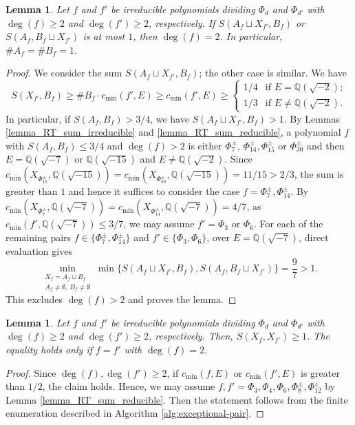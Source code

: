 \documentclass[11pt]{amsart}
\theoremstyle{plain}
\newtheorem{lem}[thm]{Lemma}
\theoremstyle{definition}
\numberwithin{equation}{section}
\def\Q{{\mathbb Q}}
\newcommand{\bbQ}{\mathbb{Q}}
\begin{document}
\begin{lem}\label{lemma_S_XA_B}
  Let $f$ and $f'$ be irreducible polynomials dividing $\Phi_d$ and $\Phi_{d'}$ with $\deg(f) \geq 2$ and $\deg(f') \geq 2$, respectively.
  If $S(A_f \sqcup X_{f'}, B_f)$
    or $S(A_f,B_f \sqcup X_{f'})$ is at most $1$, then $\deg(f) = 2$.
  In particular, $\#A_f = \#B_f = 1$.
\end{lem}
\begin{proof}
  We consider the sum $S(A_f \sqcup X_{f'}, B_f)$; the other case is similar.
  We have
  \[
    S(X_{f'},B_f) \geq \#B_f \cdot c_{\min}(f',E) \geq c_{\min}(f',E) \geq
    \begin{cases}
      1/4 & \text{if $E = \bbQ(\sqrt{-2})$;}\\
      1/3 & \text{if $E \neq \bbQ(\sqrt{-2})$.}
    \end{cases}
  \]
  In particular, if $S(A_f, B_f) >3/4$, we have
  $S(A_f \sqcup X_{f'}, B_f)> 1$.
  By Lemmas \ref{lemma_RT_sum_irreducible} and \ref{lemma_RT_sum_reducible}, a polynomial $f$ with $S(A_f, B_f) \leq 3/4$ and $\deg(f) > 2$ is either $\Phi_7^{\pm}$, $\Phi_{14}^\pm, \Phi_{15}^\pm$ or $\Phi_{30}^\pm$ and then $E = \bbQ(\sqrt{-7})$ or $\bbQ(\sqrt{-15})$ and $E \neq \bbQ(\sqrt{-2})$.
  Since $c_{\min}(X_{\Phi_{15}^\pm}, \bbQ(\sqrt{-15})) = c_{\min}(X_{\Phi_{30}^\pm}, \bbQ(\sqrt{-15})) = 11/15 > 2/3$, the sum is greater than $1$ and hence it suffices to consider the case $f = \Phi_7^\pm, \Phi_{14}^\pm$.
  By $c_{\min}(X_{\Phi_{7}^\pm}, \bbQ(\sqrt{-7})) = c_{\min}(X_{\Phi_{14}^\pm}, \bbQ(\sqrt{-7})) = 4/7$, as $c_{\min}(f',\bbQ(\sqrt{-7})) \leq 3/7$, we may assume $f' = \Phi_3$ or $\Phi_6$.
 For each of the remaining pairs $f\in\{\Phi_7^\pm,\Phi_{14}^\pm\}$ and $f'\in\{\Phi_3,\Phi_6\}$,
over $E=\Q(\sqrt{-7})$, direct evaluation gives
\[
  \min_{\substack{X_f=A_f\sqcup B_f\\
                  A_f\neq\emptyset,\ B_f\neq\emptyset}}
  \min\bigl\{
    S(A_f\sqcup X_{f'},B_f),
    S(A_f,B_f\sqcup X_{f'})
  \bigr\}
  =\frac97>1.
\]
This excludes $\deg(f)>2$ and proves the lemma.
\end{proof}

\begin{lem}\label{lemma_S_XX}
  Let $f$ and $f'$ be irreducible polynomials dividing $\Phi_d$ and $\Phi_{d'}$ with $\deg(f) \geq 2$ and $\deg(f') \geq 2$, respectively.
  Then,
  $S(X_f, X_{f'}) \geq 1$.
  The equality holds only if $f=f'$ with $\deg(f)=2$.
\end{lem}
\begin{proof}
  Since $\deg(f), \deg(f') \geq 2$, if $c_{\min}(f,E)$ or $c_{\min}(f',E)$ is greater than $1/2$, the claim holds.
  Hence, we may assume $f,f' = \Phi_3,\Phi_4,\Phi_6,\Phi_8^\pm,\Phi_{12}^\pm$ by Lemma \ref{lemma_RT_sum_reducible}.
  Then the statement follows from the finite enumeration described in Algorithm \ref{alg:exceptional-pair}.
\end{proof}
\end{document}
